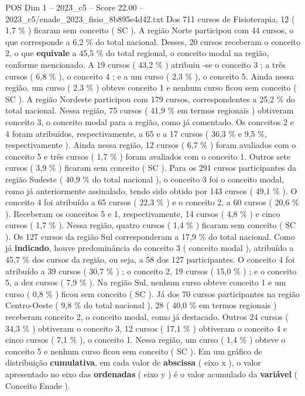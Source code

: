 \begin{textsample}{POS Dim 1 – 2023\_c5 – Score 22.00 – 2023\_c5/enade\_2023\_fisio\_8b895e4d42.txt}
Dos 711 cursos de Fisioterapia, 12 ( 1,7 \% ) ficaram sem conceito ( SC ).
A região Norte participou com 44 cursos, o que corresponde a 6,2 \% do total nacional.
Desses, 20 cursos receberam o conceito 2, o que \textbf{equivale} a 45,5 \% do total regional, o conceito modal na região, conforme mencionado.
A 19 cursos ( 43,2 \% ) atribuiu -se o conceito 3 ; a três cursos ( 6,8 \% ), o conceito 4 ; e a um curso ( 2,3 \% ), o conceito 5.
Ainda nessa região, um curso ( 2,3 \% ) obteve conceito 1 e nenhum curso ficou sem conceito ( SC ).
A região Nordeste participou com 179 cursos, correspondentes a 25,2 \% do total nacional.
Nessa região, 75 cursos ( 41,9 \% em termos regionais ) obtiveram conceito 3, o conceito modal para a região, como já comentado.
Os conceitos 2 e 4 foram atribuídos, respectivamente, a 65 e a 17 cursos ( 36,3 \% e 9,5 \%, respectivamente ).
Ainda nessa região, 12 cursos ( 6,7 \% ) foram avaliados com o conceito 5 e três cursos ( 1,7 \% ) foram avaliados com o conceito 1.
Outros sete cursos ( 3,9 \% ) ficaram sem conceito ( SC ).
Para os 291 cursos participantes da região Sudeste ( 40,9 \% do total nacional ), o conceito 3 foi o conceito modal, como já anteriormente assinalado, tendo sido obtido por 143 cursos ( 49,1 \% ).
O conceito 4 foi atribuído a 65 cursos ( 22,3 \% ) e o conceito 2, a 60 cursos ( 20,6 \% ).
Receberam os conceitos 5 e 1, respectivamente, 14 cursos ( 4,8 \% ) e cinco cursos ( 1,7 \% ).
Nessa região, quatro cursos ( 1,4 \% ) ficaram sem conceito ( SC ).
Os 127 cursos da região Sul corresponderam a 17,9 \% do total nacional.
Como já \textbf{indicado}, houve predominância do conceito 3 ( conceito modal ), atribuído a 45,7 \% dos cursos da região, ou seja, a 58 dos 127 participantes.
O conceito 4 foi atribuído a 39 cursos ( 30,7 \% ) ; o conceito 2, 19 cursos ( 15,0 \% ) ; e o conceito 5, a dez cursos ( 7,9 \% ).
Na região Sul, nenhum curso obteve conceito 1 e um curso ( 0,8 \% ) ficou sem conceito ( SC ).
Já dos 70 cursos participantes na região Centro-Oeste ( 9,8 \% do total nacional ), 28 ( 40,0 \% em termos regionais ) receberam conceito 2, o conceito modal, como já destacado.
Outros 24 cursos ( 34,3 \% ) obtiveram o conceito 3, 12 cursos ( 17,1 \% ) obtiveram o conceito 4 e cinco cursos ( 7,1 \% ), o conceito 1.
Nessa região, um curso ( 1,4 \% ) obteve o conceito 5 e nenhum curso ficou sem conceito ( SC ).
Em um gráfico de distribuição \textbf{cumulativa}, em cada valor de \textbf{abscissa} ( eixo x ), o valor apresentado no eixo das \textbf{ordenadas} ( eixo y ) é o valor acumulado da \textbf{variável} ( Conceito Enade ).

\end{textsample}
